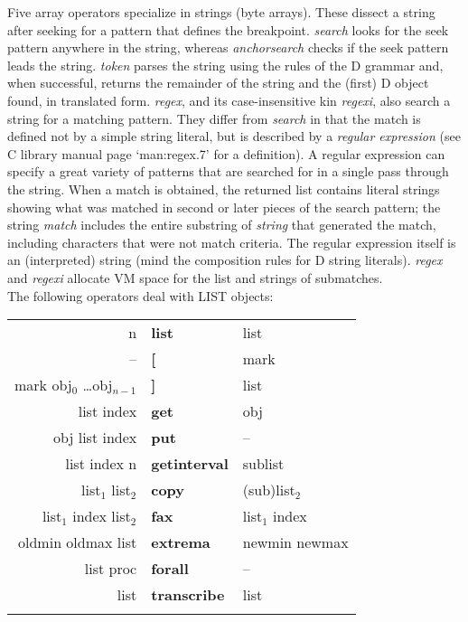 Five array operators specialize in strings (byte arrays).  These dissect  a string after seeking for a pattern that defines the  breakpoint. \emph{search} looks for the seek pattern anywhere in the string, whereas \emph{anchorsearch} checks if the seek pattern leads the string. \emph{token} parses the string using the rules of the D grammar and, when successful, returns the remainder of the string and the (first) D object found, in translated form. \emph{regex}, and its case-insensitive kin \emph{regexi}, also search a string for a matching pattern. They differ from \emph{search} in that the match is defined not by a simple string literal, but is described by a \emph{regular expression} (see C library manual page `man:regex.7' for a definition). A regular expression can specify a great variety of patterns that are searched for in a single pass through the string. When a match is obtained, the returned list contains literal strings showing what was matched in second or later pieces of the search pattern; the string \emph{match} includes the entire substring of \emph{string} that generated the match, including characters that were not match criteria. The regular expression itself is an (interpreted) string (mind the composition rules for D string literals). \emph{regex} and \emph{regexi} allocate VM space for the list and strings of submatches.\\


\noindent The following operators deal with LIST objects:

\begin{supertabular}{>{\sffamily}r>{\sffamily\bfseries}l>{\sffamily}l}
n & list & list\\
-- & [ & mark\\
mark obj$_0$ \ldots obj$_{n-1}$ & ] & list\\
list index & get & obj\\
obj list index & put & --\\
list index n & getinterval & sublist\\
list$_1$ list$_2$ & copy & (sub)list$_2$\\
list$_1$ index list$_2$ & fax & list$_1$ index\\
oldmin oldmax list & extrema & newmin newmax\\
list proc & forall & --\\
list & transcribe & list\\\\
\end{supertabular}

